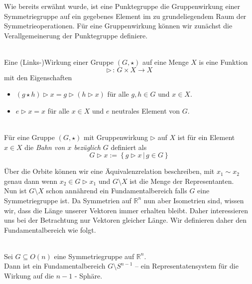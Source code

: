 Wie bereits erwähnt wurde, ist eine Punktegruppe die Gruppenwirkung einer Symmetriegruppe auf ein gegebenes Element im zu grundeliegendem Raum der Symmetrieoperationen.
Für eine Gruppenwirkung können wir zunächst die Verallgemeinerung der Punktegruppe definiere.

\begin{definition}[Gruppenwirkung]\label{fundamentalbereich:wirking} \mbox{}\\
 Eine (Links-)Wirkung einer Gruppe $(G, \star)$ auf eine Menge $X$ is eine Funktion
   $$
      \rhd \, : \, G \times X \longrightarrow X
   $$
   mit den Eigenschaften
   \begin{itemize}
      \item $(g \star h) \rhd x = g \rhd (h \rhd x)$ für alle $g,h \in G$ und $x \in X$.
      \item $e \rhd x = x$ für alle $x \in X$ und $e$ neutrales Element von $G$.
   \end{itemize}
\end{definition}

\begin{definition}[Orbit] \label{fundamentalbereich:orbit} \mbox{}\\
  Für eine Gruppe $(G, \star)$ mit Gruppenwirkung $\rhd$ auf $X$ ist für ein Element $x \in X$ die \emph{Bahn von $x$ bezüglich $G$} definiert als
   $$
      G \rhd x := \left\{ g \rhd x \, | \, g \in G \right\}
   $$
\end{definition}

Über die Orbite können wir eine Äquivalenzrelation beschreiben, mit $x_1 \sim x_2$ genau dann wenn $x_2 \in G \rhd x_1$ und $G \setminus X$ ist die Menge der Representanten.\\

Nun ist $G \setminus X$ schon annährend ein Fundamentalbereich falls $G$ eine Symmetriegruppe ist. Da Symmetrien auf $\mathbb{R}^n$ nun aber Isometrien sind, wissen wir, dass die Länge unserer Vektoren immer erhalten bleibt. Daher interessieren uns bei der Betrachtung nur Vektoren gleicher Länge. Wir definieren daher den Fundamentalbereich wie folgt.\\

\begin{definition}[Fundamentalbereich]\label{fundamentalbereich:def} \mbox{}\\
   Sei $G \subseteq O(n)$ eine Symmetriegruppe auf $\mathbb{R}^n$.\\

   Dann ist ein Fundamentalbereich $G \setminus S^{n-1}$ -- ein Representatensystem für die Wirkung auf die $n-1$ - Sphäre.
\end{definition}

